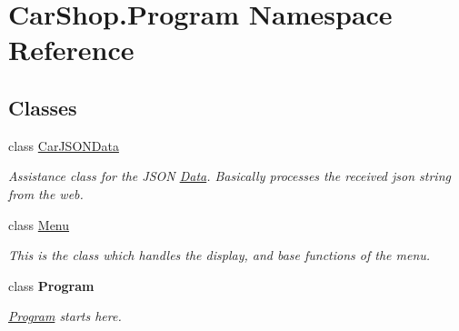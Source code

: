 \hypertarget{namespace_car_shop_1_1_program}{}\section{Car\+Shop.\+Program Namespace Reference}
\label{namespace_car_shop_1_1_program}
\subsection*{Classes}
\begin{DoxyCompactItemize}
\item 
class \mbox{\hyperlink{class_car_shop_1_1_program_1_1_car_j_s_o_n_data}{Car\+J\+S\+O\+N\+Data}}
\begin{DoxyCompactList}\small\item\em Assistance class for the J\+S\+ON \mbox{\hyperlink{namespace_car_shop_1_1_data}{Data}}. Basically processes the received json string from the web. \end{DoxyCompactList}\item 
class \mbox{\hyperlink{class_car_shop_1_1_program_1_1_menu}{Menu}}
\begin{DoxyCompactList}\small\item\em This is the class which handles the display, and base functions of the menu. \end{DoxyCompactList}\item 
class {\bfseries Program}
\begin{DoxyCompactList}\small\item\em \mbox{\hyperlink{namespace_car_shop_1_1_program}{Program}} starts here. \end{DoxyCompactList}\end{DoxyCompactItemize}
